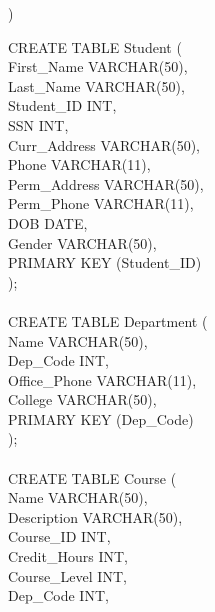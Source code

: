 \documentclass[12pt]{article}
\newenvironment{PTMono}{\fontfamily{PTMono-TLF}\selectfont}{\par}
\begin{document}
\hrulefill
\pagebreak





)

\begin{multicols}{2}
\begin{PTMono} \footnotesize

\noindent CREATE TABLE Student (\\
\indent  First\_Name VARCHAR(50),\\
\indent  Last\_Name VARCHAR(50),\\
\indent  Student\_ID INT,\\
\indent  SSN INT,\\
\indent  Curr\_Address VARCHAR(50),\\
\indent  Phone VARCHAR(11),\\
\indent  Perm\_Address VARCHAR(50),\\
\indent  Perm\_Phone VARCHAR(11),\\
\indent  DOB DATE,\\
\indent  Gender VARCHAR(50),\\

PRIMARY KEY (Student\_ID)\\
);\\\\



\noindent CREATE TABLE Department (\\
\indent Name VARCHAR(50),\\
\indent Dep\_Code INT,\\
\indent Office\_Phone VARCHAR(11),\\
\indent College VARCHAR(50),\\

  PRIMARY KEY (Dep\_Code)\\
);\\\\



\noindent CREATE TABLE Course (\\
\indent  Name VARCHAR(50),\\
\indent  Description VARCHAR(50),\\
\indent  Course\_ID INT,\\
\indent  Credit\_Hours INT,\\
\indent  Course\_Level INT,\\
\indent  Dep\_Code INT,\\


\end{PTMono}
\end{multicols}
\end{document}
